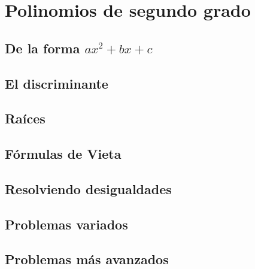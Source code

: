 \chapter{Polinomios de segundo grado}



\section{De la forma $ax^2 + bx + c$}

\section{El discriminante}

\section{Raíces}

\section{Fórmulas de Vieta}

\section{Resolviendo desigualdades}

\section{Problemas variados}

\section{Problemas más avanzados}
